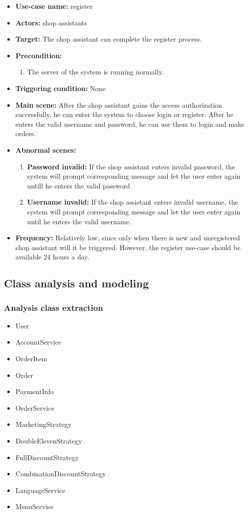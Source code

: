 \documentclass[a4paper]{report}
\begin{document}
 \begin{itemize}
\item \textbf{Use-case name:}  register
\item \textbf{Actors:} shop assistants
\item \textbf{Target:} The shop assistant can complete the register process.
\item \textbf{Precondition:} 
\begin{enumerate}
\item The server of the system is running normally.
\end{enumerate}
\item \textbf{Triggering condition:} None
\item \textbf{Main scene:} After the shop assistant gains the access authorization successfully, he can enter the system to choose login or register. After he enters the valid username and password, he can use them to login and make orders.
\item \textbf{Abnormal scenes:} 
\begin{enumerate}
\item  \textbf{Password invalid:} If the shop assistant enters invalid password, the system will prompt corresponding message and let the user enter again untill he enters the valid password.
\item \textbf{Username invalid:} If the shop assistant enters invalid username, the system will prompt corresponding message and let the user enter again until he enters the valid username.
\end{enumerate}
\item \textbf{Frequency:}  Relatively low, since only when there is new and unregistered shop assistant will it be triggered. However, the register use-case should be available 24 hours a day. 
\end{itemize}

\subsection{Class analysis and modeling}
\subsubsection{Analysis class extraction}
\begin{itemize}
\item User
\item AccountService
\item OrderItem
\item Order
\item PaymentInfo
\item OrderService
\item MarketingStrategy
\item DoubleElevenStrategy
\item FullDiscountStrategy
\item CombinationDiscountStrategy
\item LanguageService
\item MenuService
\end{itemize}
\end{document}
